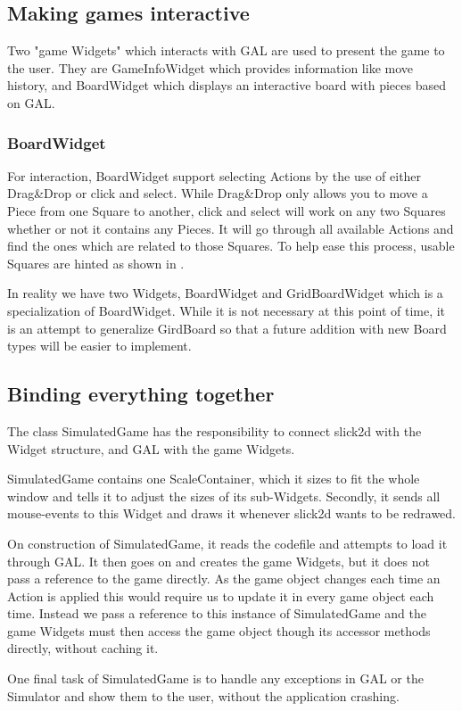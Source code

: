 \subsection{Making games interactive}

Two "game Widgets" which interacts with GAL are used to present the game to the user. They are GameInfoWidget which provides information like move history, and BoardWidget which displays an interactive board with pieces based on GAL.

\subsubsection{BoardWidget}

For interaction, BoardWidget support selecting Actions by the use of either Drag\&Drop or click and select. While Drag\&Drop only allows you to move a Piece from one Square to another, click and select will work on any two Squares whether or not it contains any Pieces. It will go through all available Actions and find the ones which are related to those Squares. To help ease this process, usable Squares are hinted as shown in .

In reality we have two Widgets, BoardWidget and GridBoardWidget which is a specialization of BoardWidget. While it is not necessary at this point of time, it is an attempt to generalize GirdBoard so that a future addition with new Board types will be easier to implement.


\subsection{Binding everything together}

The class SimulatedGame has the responsibility to connect slick2d with the Widget structure, and GAL with the game Widgets.

SimulatedGame contains one ScaleContainer, which it sizes to fit the whole window and tells it to adjust the sizes of its sub-Widgets. Secondly, it sends all mouse-events to this Widget and draws it whenever slick2d wants to be redrawed.

On construction of SimulatedGame, it reads the \productname codefile and attempts to load it through GAL. It then goes on and creates the game Widgets, but it does not pass a reference to the game directly. As the game object changes each time an Action is applied this would require us to update it in every game object each time. Instead we pass a reference to this instance of SimulatedGame and the game Widgets must then access the game 
object though its accessor methods directly, without caching it.

One final task of SimulatedGame is to handle any exceptions in GAL or the Simulator and show them to the user, without the application crashing.